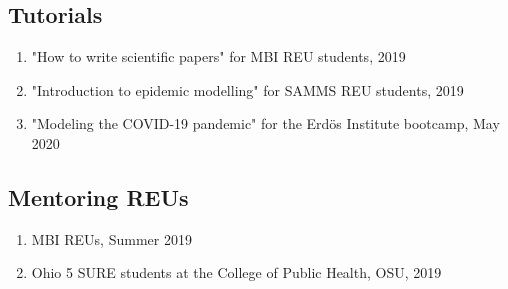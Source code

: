 \documentclass[11pt,a4paper,sans]{moderncv}        %
\begin{document}
\subsection{Tutorials}
\begin{enumerate}
\item {"How to write scientific papers" for MBI REU students, 2019}
\item {"Introduction to epidemic modelling" for SAMMS REU students, 2019}
\item {"Modeling the COVID-19 pandemic" for the Erd\"os Institute bootcamp, May 2020}
\end{enumerate}

\subsection{Mentoring REUs}
\begin{enumerate}
\item{MBI REUs, Summer 2019}
\item{Ohio 5 SURE students at the College of Public Health, OSU, 2019}
\end{enumerate}
\end{document}
